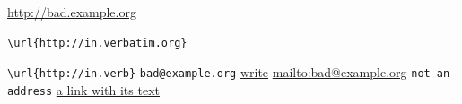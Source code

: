 \url{http://bad.example.org} %
\begin{verbatim}
\url{http://in.verbatim.org}
\end{verbatim}
\verb|\url{http://in.verb}|
\texttt{bad@example.org} %
\href{mailto:bad@example.org}{write} %
\newcommand{\mailbad}[1]{\href{mailto:#1}{\texttt{#1}}} %
\url{mailto:bad@example.org} %
   
\texttt{not-an-address} \href{http://good.example.org}{a link with its text}
